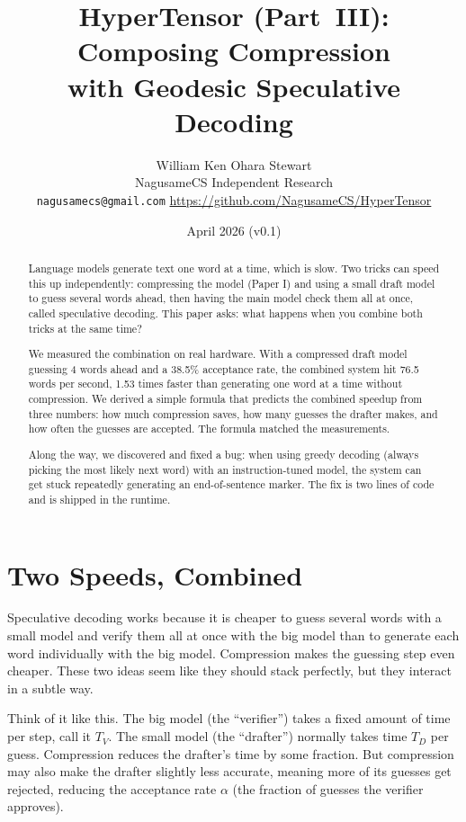 \documentclass[11pt]{article}
\title{HyperTensor (Part~III): Composing Compression\\with Geodesic Speculative Decoding}
\author{William Ken Ohara Stewart\\
\small NagusameCS Independent Research\\
\small \texttt{nagusamecs@gmail.com} \quad \url{https://github.com/NagusameCS/HyperTensor}}
\date{April 2026 (v0.1)}
\begin{document}
\maketitle
\hypertensorbanner

\begin{abstract}
\noindent
Language models generate text one word at a time, which is slow. Two tricks
can speed this up independently: compressing the model (Paper I) and using a
small draft model to guess several words ahead, then having the main model
check them all at once, called speculative decoding. This paper asks: what
happens when you combine both tricks at the same time?

We measured the combination on real hardware. With a compressed draft model
guessing 4 words ahead and a 38.5\% acceptance rate, the combined system hit
76.5 words per second, 1.53 times faster than generating one word at a time
without compression. We derived a simple formula that predicts the combined
speedup from three numbers: how much compression saves, how many guesses the
drafter makes, and how often the guesses are accepted. The formula matched
the measurements.

Along the way, we discovered and fixed a bug: when using greedy decoding
(always picking the most likely next word) with an instruction-tuned model,
the system can get stuck repeatedly generating an end-of-sentence marker.
The fix is two lines of code and is shipped in the runtime.
\end{abstract}

\section{Two Speeds, Combined}

Speculative decoding works because it is cheaper to guess several words with
a small model and verify them all at once with the big model than to generate
each word individually with the big model. Compression makes the guessing
step even cheaper. These two ideas seem like they should stack perfectly, but
they interact in a subtle way.

Think of it like this. The big model (the ``verifier'') takes a fixed amount
of time per step, call it $T_V$. The small model (the ``drafter'') normally
takes time $T_D$ per guess. Compression reduces the drafter's time by some
fraction. But compression may also make the drafter slightly less accurate,
meaning more of its guesses get rejected, reducing the acceptance rate
$\alpha$ (the fraction of guesses the verifier approves).
\end{document}
